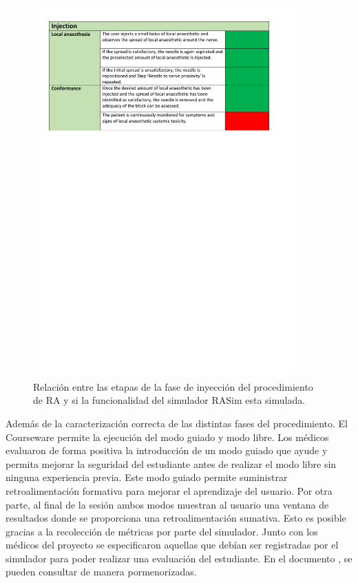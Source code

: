 \begin{figure}[h]
    \centering
    \includegraphics[trim={1cm 19cm 1cm 1cm},clip,width=0.9\textwidth]{PDFs/RA3.pdf}
       \caption{Relación entre las etapas de la fase de inyección del procedimiento de \ac{RA} y si la funcionalidad del simulador \ac{RASim} esta simulada.\label{fig:RAsteps3} }
    
\end{figure}


Además de la caracterización correcta de las distintas fases del procedimiento. El \ac{Courseware} permite la ejecución del modo guiado y modo libre. Los médicos evaluaron de forma positiva la introducción de un modo guiado que ayude y permita mejorar la seguridad del estudiante antes de realizar el modo libre sin ninguna experiencia previa. Este modo guiado permite suministrar retroalimentación formativa para mejorar el aprendizaje del usuario. Por otra parte, al final de la sesión ambos modos muestran al usuario una ventana de resultados donde se proporciona una retroalimentación sumativa. Esto es posible gracias a la recolección de métricas por parte del simulador. Junto con los médicos del proyecto se especificaron aquellas que debían ser registradas por el simulador para poder realizar una evaluación del estudiante. En el documento \cite{ded4.4}, se pueden consultar de manera pormenorizadas.

